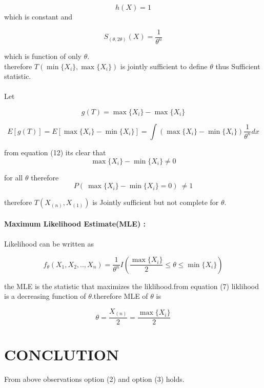 \documentclass[journal,12pt,twocolumn]{IEEEtran}
\begin{document}
\begin{equation}
    h(X)=1
\end{equation}
 which is constant and
 
\begin{equation}
    S_{(\theta,2\theta)}(X)=\frac{1}{\theta^n}
\end{equation}

 which is function of only $\theta$.\\
therefore $T(\min\{X_i\},\max\{X_i\})$ is jointly sufficient to define $\theta$ thus Sufficient statistic.\\ \\
Let 

\begin{equation}
    g(T)=\max\{X_i\}-\max\{X_i\}
\end{equation}

\begin{equation}
    E[g(T)]=E[\max\{X_i\}-\min\{X_i\}]=\int (\max\{X_i\}-\min\{X_i\})\frac{1}{\theta^n}dx
\end{equation}

from equation (12) its clear that
\begin{equation}
    \max\{X_i\}-\min\{X_i\}\neq0
\end{equation}

for all $\theta$ therefore 
\begin{equation}
    P(\ \max\{X_i\}-\min\{X_i\}=0 )\ \neq1
\end{equation}

therefore $T(X_{(n)},X_{(1)})$ is Jointly sufficient but not complete for $\theta$. \\ \\
\textbf{Maximum Likelihood Estimate(MLE) :}\\ \\
Likelihood can be written as 

\begin{equation}
    f_\theta(X_1,X_2,..,X_n)=\frac{1}{\theta^n}I\left( \frac{\max     \{X_i\}}{2}\leq\theta\leq \min\{X_i\}\right)
\end{equation}

the MLE is the statistic that maximizes the liklihood.from equation (7) liklihood is a decreasing function of $\theta$.therefore MLE of $\theta$ is 

\begin{equation}
   \theta=\frac{X_{(n)}}{2}=\frac{\max\{X_i\}}{2}
\end{equation}

\section{\textbf{CONCLUTION}}
From above observations option (2) and option (3) holds.
\end{document}
